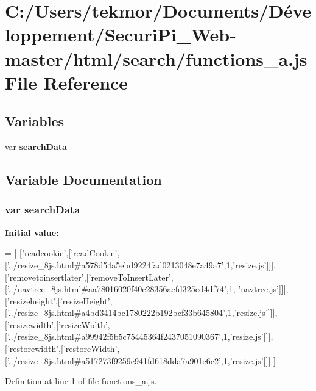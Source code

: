 \section{C\+:/\+Users/tekmor/\+Documents/\+Développement/\+Securi\+Pi\+\_\+\+Web-\/master/html/search/functions\+\_\+a.js File Reference}
\label{functions__a_8js}
\subsection*{Variables}
\begin{DoxyCompactItemize}
\item 
var {\bf search\+Data}
\end{DoxyCompactItemize}


\subsection{Variable Documentation}
\subsubsection[{search\+Data}]{\setlength{\rightskip}{0pt plus 5cm}var search\+Data}\label{functions__a_8js_ad01a7523f103d6242ef9b0451861231e}
{\bfseries Initial value\+:}
\begin{DoxyCode}
=
[
  [\textcolor{stringliteral}{'readcookie'},[\textcolor{stringliteral}{'readCookie'},[\textcolor{stringliteral}{'../resize\_8js.html#a578d54a5ebd9224fad0213048e7a49a7'},1,\textcolor{stringliteral}{'resize.js'}]]],
  [\textcolor{stringliteral}{'removetoinsertlater'},[\textcolor{stringliteral}{'removeToInsertLater'},[\textcolor{stringliteral}{'../navtree\_8js.html#aa78016020f40c28356aefd325cd4df74'},1,\textcolor{stringliteral}{
      'navtree.js'}]]],
  [\textcolor{stringliteral}{'resizeheight'},[\textcolor{stringliteral}{'resizeHeight'},[\textcolor{stringliteral}{'../resize\_8js.html#a4bd3414bc1780222b192bcf33b645804'},1,\textcolor{stringliteral}{'resize.js'}]]],
  [\textcolor{stringliteral}{'resizewidth'},[\textcolor{stringliteral}{'resizeWidth'},[\textcolor{stringliteral}{'../resize\_8js.html#a99942f5b5c75445364f2437051090367'},1,\textcolor{stringliteral}{'resize.js'}]]],
  [\textcolor{stringliteral}{'restorewidth'},[\textcolor{stringliteral}{'restoreWidth'},[\textcolor{stringliteral}{'../resize\_8js.html#a517273f9259c941fd618dda7a901e6c2'},1,\textcolor{stringliteral}{'resize.js'}]]]
]
\end{DoxyCode}


Definition at line 1 of file functions\+\_\+a.\+js.

